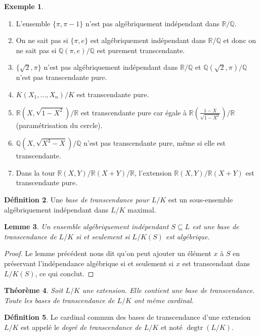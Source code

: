 \documentclass{article}
\newcommand{\Q}{\mathbb{Q}}
\newcommand{\R}{\mathbb{R}}
\DeclareMathOperator{\degtr}{degtr}
\theoremstyle{plain}
\newtheorem{theorem}{Théorème}[subsection]
\newtheorem{lemma}[theorem]{Lemme}
\theoremstyle{definition}
\newtheorem{definition}[theorem]{Définition}
\newtheorem{example}[theorem]{Exemple}
\theoremstyle{remark}
\begin{document}
\begin{example} \leavevmode
    \begin{enumerate}
        \item L'ensemble $\{\pi,\pi-1\}$ n'est pas algébriquement indépendant dans $\R/\Q$.
        \item On ne sait pas si $\{\pi,e\}$ est algébriquement indépendant dans $\R/\Q$ et donc on ne sait pas si $\Q(\pi,e)/\Q$ est purement transcendante.
        \item $\{\sqrt{2},\pi\}$ n'est pas algébriquement indépendant dans $\R/\Q$ et $\Q(\sqrt{2},\pi)/\Q$ n'est pas transcendante pure.
        \item $K(X_1,\dots,X_n)/K$ est transcendante pure.
        \item $\R(X,\sqrt{1-X^2})/\R$ est transcendante pure car égale à $\R\left(\frac{1-X}{\sqrt{1-X^2}}\right)/\R$ (paramétrisation du cercle).
        \item $\Q(X,\sqrt{X^3 - X})/\Q$ n'est pas transcendante pure, même si elle est transcendante.
        \item Dans la tour $\R(X,Y)/\R(X+Y)/\R$, l'extension $\R(X,Y)/\R(X+Y)$ est transcendante pure.
    \end{enumerate}
\end{example}

\begin{definition}
    Une \emph{base de transcendance pour $L/K$} est un sous-ensemble algébriquement indépendant dans $L/K$ maximal.
\end{definition}

\begin{lemma} \label{lembasetrans}
    Un ensemble algébriquement indépendant $S \subseteq L$ est une base de transcendance de $L/K$ si et seulement si $L/K(S)$ est algébrique.
\end{lemma}

\begin{proof}
    Le lemme précédent nous dit qu'on peut ajouter un élément $x$ à $S$ en préservant l'indépendance algébrique si et seulement si $x$ est transcendant dans $L/K(S)$, ce qui conclut.
\end{proof}

\begin{theorem}
    Soit $L/K$ une extension. Elle contient une base de transcendance. Toute les bases de transcendance de $L/K$ ont même cardinal.
\end{theorem}

\begin{definition}
    Le cardinal commun des bases de transcendance d'une extension $L/K$ est appelé le \emph{degré de transcendance de $L/K$} et noté $\degtr(L/K)$.
\end{definition}
\end{document}
